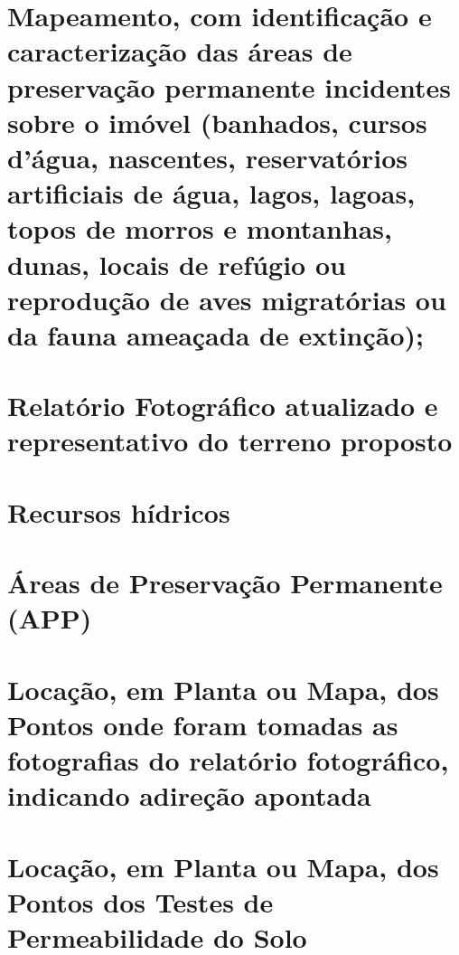 \chapter{Mapeamento, com identificação e caracterização das áreas de preservação permanente incidentes sobre o imóvel (banhados, cursos d’água, nascentes, reservatórios artificiais de água, lagos, lagoas, topos de morros e montanhas, dunas, locais de refúgio ou reprodução de aves migratórias ou da fauna ameaçada de extinção);}

%

\chapter{Relatório Fotográfico atualizado e representativo do terreno proposto}

\chapter{Recursos hídricos}
\label{chap:hidro}
\clearpage



\chapter{Áreas de Preservação Permanente (APP)}
\label{chap:rechidr}
\clearpage


\chapter{Locação, em Planta ou Mapa, dos Pontos onde foram tomadas as fotografias do relatório fotográfico, indicando adireção apontada}
\label{chap:fotografia}
\clearpage

\chapter{Locação, em Planta ou Mapa, dos Pontos dos Testes de Permeabilidade do Solo}
\label{chap:permeabilidade}
\clearpage

